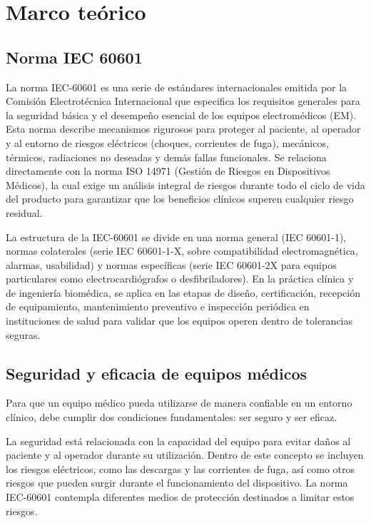 \section{Marco teórico}    

\subsection{Norma IEC 60601}
La norma IEC-60601 es una serie de estándares internacionales emitida por la Comisión Electrotécnica Internacional que
especifica los requisitos generales para la seguridad básica y el desempeño esencial de los equipos electromédicos (EM). 
Esta norma describe mecanismos rigurosos para proteger al paciente, al operador y al entorno de riesgos eléctricos (choques,
corrientes de fuga), mecánicos, térmicos, radiaciones no deseadas y demás fallas funcionales. Se relaciona directamente con
la norma ISO 14971 (Gestión de Riesgos en Dispositivos Médicos), la cual exige un análisis integral de riesgos durante todo el
ciclo de vida del producto para garantizar que los beneficios clínicos superen cualquier riesgo residual.

La estructura de la IEC-60601 se divide en una norma general (IEC 60601-1), normas colaterales (serie IEC 60601-1-X, sobre
compatibilidad electromagnética, alarmas, usabilidad) y normas específicas (serie IEC 60601-2X para equipos particulares
como electrocardiógrafos o desfibriladores). En la práctica clínica y de ingeniería biomédica, se aplica en las etapas
de diseño, certificación, recepción de equipamiento, mantenimiento preventivo e inspección periódica en instituciones de salud
para validar que los equipos operen dentro de tolerancias seguras.

\subsection{Seguridad y eficacia de equipos médicos}
Para que un equipo médico pueda utilizarse de manera confiable en un entorno clínico, 
debe cumplir dos condiciones fundamentales: ser seguro y ser eficaz.

La seguridad está relacionada con la capacidad del equipo para evitar daños al paciente y al operador durante 
su utilización. Dentro de este concepto se incluyen los riesgos eléctricos, como las descargas y las corrientes de fuga,
 así como otros riesgos que pueden surgir durante el funcionamiento del dispositivo. La norma IEC-60601 contempla 
diferentes medios de protección destinados a limitar estos riesgos.

